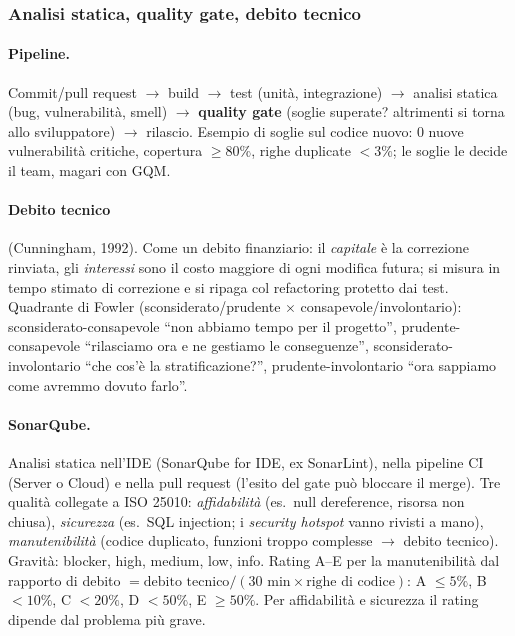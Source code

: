 \documentclass[a4paper,12pt]{article}
\begin{document}
\subsubsection{Analisi statica, quality gate, debito tecnico}
\paragraph{Pipeline.} Commit/pull request $\to$ build $\to$ test (unità, integrazione)
$\to$ analisi statica (bug, vulnerabilità, smell) $\to$ \textbf{quality gate} (soglie
superate? altrimenti si torna allo sviluppatore) $\to$ rilascio. Esempio di soglie sul
codice nuovo: 0 nuove vulnerabilità critiche, copertura $\ge 80\%$, righe duplicate
$<3\%$; le soglie le decide il team, magari con GQM.

\paragraph{Debito tecnico} (Cunningham, 1992). Come un debito finanziario: il
\emph{capitale} è la correzione rinviata, gli \emph{interessi} sono il costo maggiore di ogni
modifica futura; si misura in tempo stimato di correzione e si ripaga col refactoring protetto
dai test. Quadrante di Fowler (sconsiderato/prudente $\times$ consapevole/involontario):
sconsiderato-consapevole ``non abbiamo tempo per il progetto'', prudente-consapevole
``rilasciamo ora e ne gestiamo le conseguenze'', sconsiderato-involontario ``che cos'è la
stratificazione?'', prudente-involontario ``ora sappiamo come avremmo dovuto farlo''.

\paragraph{SonarQube.} Analisi statica nell'IDE (SonarQube for IDE, ex SonarLint), nella
pipeline CI (Server o Cloud) e nella pull request (l'esito del gate può bloccare il merge).
Tre qualità collegate a ISO 25010: \emph{affidabilità} (es.\ null dereference, risorsa non
chiusa), \emph{sicurezza} (es.\ SQL injection; i \emph{security hotspot} vanno rivisti a
mano), \emph{manutenibilità} (codice duplicato, funzioni troppo complesse $\to$ debito
tecnico). Gravità: blocker, high, medium, low, info. Rating A--E per la manutenibilità dal
rapporto di debito $= \text{debito tecnico} / (30\text{ min} \times \text{righe di codice})$:
A $\le 5\%$, B $<10\%$, C $<20\%$, D $<50\%$, E $\ge 50\%$. Per affidabilità e sicurezza il
rating dipende dal problema più grave.
\end{document}
